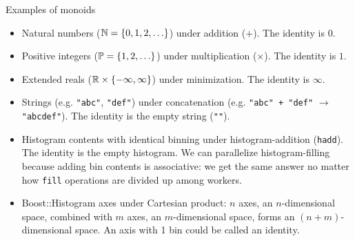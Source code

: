 \documentclass[aspectratio=169]{beamer}
\begin{document}
\begin{frame}{Examples of monoids}
\large
\vspace{0.5 cm}

\begin{itemize}\setlength{\itemsep}{0.25 cm}
\item<1-> Natural numbers ($\Bbb{N} = \{0, 1, 2, \ldots\}$) under addition ($+$). The identity is $0$.
\item<2-> Positive integers ($\Bbb{P} = \{1, 2, \ldots\}$) under multiplication ($\times$). The identity is $1$.
\item<3-> Extended reals ($\Bbb{R} \times \{-\infty, \infty\}$) under minimization. The identity is $\infty$.
\item<4-> Strings (e.g. \texttt{"abc"}, \texttt{"def"}) under concatenation (e.g. \texttt{"abc" + "def"} $\to$ \texttt{"abcdef"}). The identity is the empty string (\texttt{""}).
\item<5-> Histogram contents with identical binning under histogram-addition (\texttt{hadd}). The identity is the empty histogram. We can parallelize histogram-filling because adding bin contents is associative: we get the same answer no matter how \texttt{fill} operations are divided up among workers.
\item<6-> Boost::Histogram axes under Cartesian product: $n$ axes, an $n$-dimensional space, combined with $m$ axes, an $m$-dimensional space, forms an $(n + m)$-dimensional space. An axis with 1 bin could be called an identity.
\end{itemize}
\end{frame}
\end{document}
